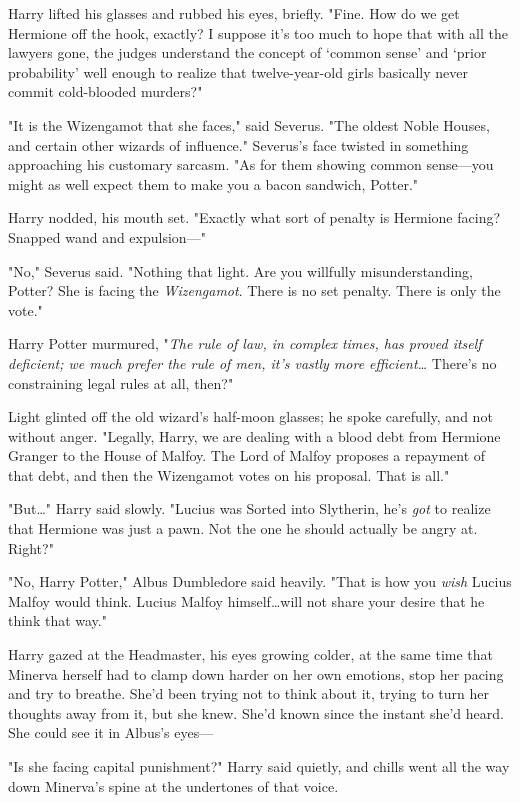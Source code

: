 Harry lifted his glasses and rubbed his eyes, briefly. "Fine. How do we get
Hermione off the hook, exactly? I suppose it's too much to hope that with all
the lawyers gone, the judges understand the concept of `common sense' and
`prior probability' well enough to realize that twelve-year-old girls basically
never commit cold-blooded murders?"

"It is the Wizengamot that she faces," said Severus. "The oldest Noble Houses,
and certain other wizards of influence." Severus's face twisted in something
approaching his customary sarcasm. "As for them showing common sense—you
might as well expect them to make you a bacon sandwich, Potter."

Harry nodded, his mouth set. "Exactly what sort of penalty is Hermione facing?
Snapped wand and expulsion—"

"No," Severus said. "Nothing that light. Are you willfully misunderstanding,
Potter? She is facing the \emph{Wizengamot}. There is no set penalty. There is
only the vote."

Harry Potter murmured, "\emph{The rule of law, in complex times, has proved
itself deficient; we much prefer the rule of men, it's vastly more
efficient…} There's no constraining legal rules at all, then?"

Light glinted off the old wizard's half-moon glasses; he spoke carefully, and
not without anger. "Legally, Harry, we are dealing with a blood debt from
Hermione Granger to the House of Malfoy. The Lord of Malfoy proposes a
repayment of that debt, and then the Wizengamot votes on his proposal. That is
all."

"But…" Harry said slowly. "Lucius was Sorted into Slytherin, he's
\emph{got} to realize that Hermione was just a pawn. Not the one he should
actually be angry at. Right?"

"No, Harry Potter," Albus Dumbledore said heavily. "That is how you \emph{wish}
Lucius Malfoy would think. Lucius Malfoy himself…will not share your
desire that he think that way."

Harry gazed at the Headmaster, his eyes growing colder, at the same time that
Minerva herself had to clamp down harder on her own emotions, stop her pacing
and try to breathe. She'd been trying not to think about it, trying to turn her
thoughts away from it, but she knew. She'd known since the instant she'd heard.
She could see it in Albus's eyes—

"Is she facing capital punishment?" Harry said quietly, and chills went all the
way down Minerva's spine at the undertones of that voice.

